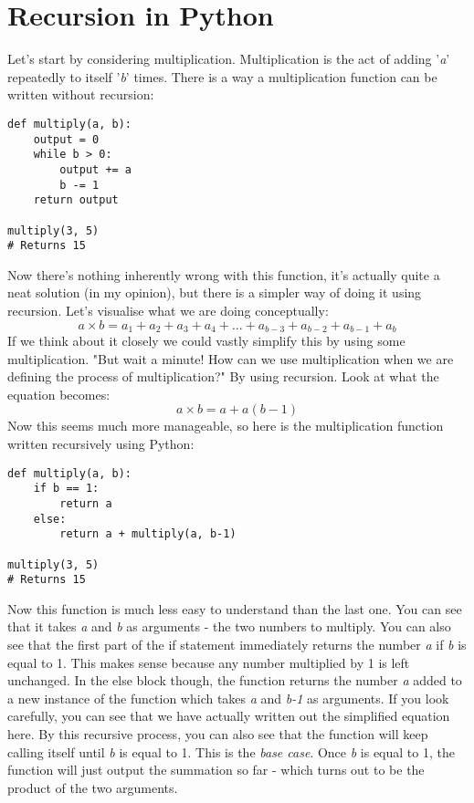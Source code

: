 \documentclass{article}
\begin{document}
\section{Recursion in Python}
Let's start by considering multiplication. Multiplication is the act of adding '\textit{a}' repeatedly to itself '\textit{b}' times. There is a way a multiplication function can be written without recursion:

\begin{verbatim}
def multiply(a, b):
    output = 0
	while b > 0:
		output += a
		b -= 1
	return output

multiply(3, 5)
# Returns 15
\end{verbatim}
Now there's nothing inherently wrong with this function, it's actually quite a neat solution (in my opinion), but there is a simpler way of doing it using recursion. Let's visualise what we are doing conceptually:
\[a\times b=a_1+a_2+a_3+a_4+...+a_{b-3}+a_{b-2}+a_{b-1}+a_b \]
If we think about it closely we could vastly simplify this by using some multiplication. "But wait a minute! How can we use multiplication when we are defining the process of multiplication?" By using recursion. Look at what the equation becomes:
\[a\times b=a+a(b-1)\]
Now this seems much more manageable, so here is the multiplication function written recursively using Python:

\begin{verbatim}
def multiply(a, b):
	if b == 1:
		return a
	else:
		return a + multiply(a, b-1)

multiply(3, 5)
# Returns 15
\end{verbatim}

Now this function is much less easy to understand than the last one. You can see that it takes \textit{a} and \textit{b} as arguments - the two numbers to multiply. You can also see that the first part of the if statement immediately returns the number \textit{a} if \textit{b} is equal to 1. This makes sense because any number multiplied by 1 is left unchanged. In the else block though, the function returns the number \textit{a} added to a new instance of the function which takes \textit{a} and \textit{b-1} as arguments. If you look carefully, you can see that we have actually written out the simplified equation here. By this recursive process, you can also see that the function will keep calling itself until \textit{b} is equal to 1. This is the \textit{base case}. Once \textit{b} is equal to 1, the function will just output the summation so far - which turns out to be the product of the two arguments. \medskip
\end{document}
